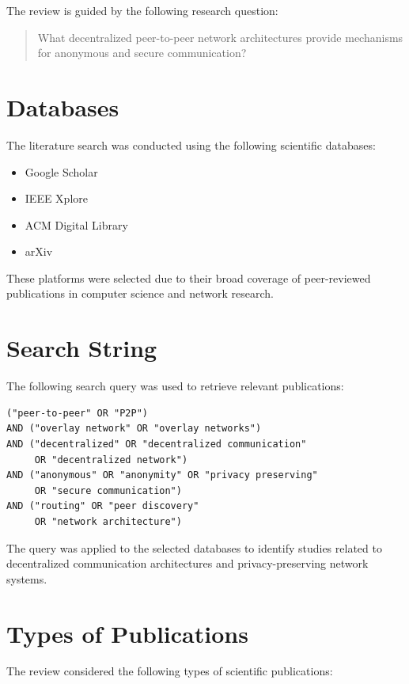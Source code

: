 \documentclass[
  12pt,
  oneside,
  a4paper,
  chapter=TITLE,
  section=TITLE,
  english,
  brazil
]{abntex2}
\begin{document}
The review is guided by the following research question:

\begin{quote}
What decentralized peer-to-peer network architectures provide mechanisms for anonymous and secure communication?
\end{quote}

\section{Databases}

The literature search was conducted using the following scientific databases:

\begin{itemize}
    \item Google Scholar
    \item IEEE Xplore
    \item ACM Digital Library
    \item arXiv
\end{itemize}

These platforms were selected due to their broad coverage of peer-reviewed publications in computer science and network research.

\section{Search String}

The following search query was used to retrieve relevant publications:

\begin{verbatim}
("peer-to-peer" OR "P2P") 
AND ("overlay network" OR "overlay networks") 
AND ("decentralized" OR "decentralized communication"
     OR "decentralized network") 
AND ("anonymous" OR "anonymity" OR "privacy preserving"
     OR "secure communication") 
AND ("routing" OR "peer discovery"
     OR "network architecture")
\end{verbatim}

The query was applied to the selected databases to identify studies related to decentralized communication architectures and privacy-preserving network systems.

\section{Types of Publications}

The review considered the following types of scientific publications:
\end{document}
